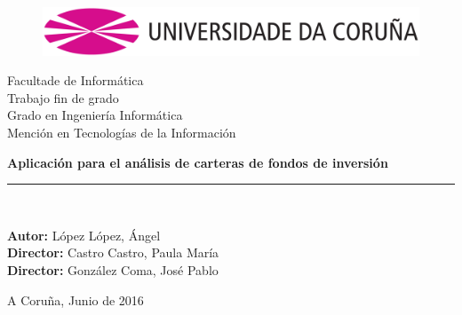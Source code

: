 \documentclass[12pt, a4paper]{article}
\newcommand*\parttitle{}
\let\origpart\part
\renewcommand*{\part}[2][]{%
	\ifx\\#1\\%
	\origpart{#2}%
	\renewcommand*\parttitle{#2}%
	\else
	\origpart[#1]{#2}%
	\renewcommand*\parttitle{#1}%
	\fi
}
\begin{document}
\renewcommand{\partname}{Capítulo}
\renewcommand{\tablename}{Tabla}
\renewcommand{\acronymname }{Acrónimos}
\let\Oldpart\part



\begin{titlepage}

\begin{center}
\vspace*{-0.2in}
\begin{figure}[htb]
\begin{center}
\includegraphics[width=12cm]{figuras/logo.png}
\end{center}
\end{figure}
\vspace*{0.6in}
{\Large Facultade de Informática}\\[1.25cm]
\vspace*{0.15in}
{\LARGE Trabajo fin de grado}\\[0.75cm]
{\LARGE  Grado en Ingeniería Informática}\\[0.5cm]
{Mención en Tecnologías de la Información }\\[1.25cm]
\vspace*{0.6in}
\vspace*{0.2in}
\begin{Large}
\textbf{Aplicación para el análisis de carteras de fondos de inversión} \\
\end{Large}
\vspace*{2in}
\vspace*{0.3in}
\rule{80mm}{0.1mm}\\
\vspace*{0.1in}
\begin{large}
\textbf{Autor:} López López, Ángel\\
\textbf{Director:} Castro Castro, Paula María\\
\textbf{Director:} González Coma, José Pablo \\
\end{large}
\vspace*{0.3in}
A Coruña, Junio de 2016
\end{center}

\end{titlepage}
\end{document}
